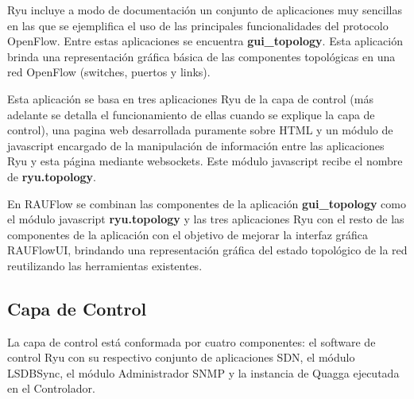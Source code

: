 Ryu incluye a modo de documentaci\'on un conjunto de aplicaciones muy sencillas en las que se ejemplifica el uso de las principales funcionalidades del protocolo OpenFlow. Entre estas aplicaciones se encuentra \textbf{gui\_topology}. Esta aplicaci\'on brinda una representaci\'on gr\'afica b\'asica de las componentes topol\'ogicas en una red OpenFlow (switches, puertos y links).

Esta aplicaci\'on se basa en tres aplicaciones Ryu de la capa de control (m\'as adelante se detalla el funcionamiento de ellas cuando se explique la capa de control), una pagina web desarrollada puramente sobre HTML y un m\'odulo de javascript encargado de la manipulaci\'on de informaci\'on entre las aplicaciones Ryu y esta p\'agina mediante websockets. Este m\'odulo javascript recibe el nombre de \textbf{ryu.topology}.

En RAUFlow se combinan las componentes de la aplicaci\'on \textbf{gui\_topology} como el m\'odulo javascript \textbf{ryu.topology} y las tres aplicaciones Ryu con el resto de las componentes de la aplicaci\'on con el objetivo de mejorar la interfaz gr\'afica RAUFlowUI, brindando una representaci\'on gr\'afica del estado topol\'ogico de la red reutilizando las herramientas existentes.\\
 

\subsection{Capa de Control}

La capa de control est\'a conformada por cuatro componentes: el software de control Ryu con su respectivo conjunto de aplicaciones SDN, el m\'odulo LSDBSync, el m\'odulo Administrador SNMP y la instancia de Quagga ejecutada en el Controlador.\\

 

